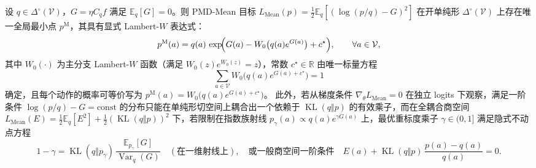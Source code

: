 \documentclass[lang=cn,scheme=chinese,openany]{../book/elegantbook}
\newcommand{\E}{\mathbb E}
\newcommand{\KL}{\operatorname{KL}}
\newcommand{\Var}{\operatorname{Var}}
\newcommand{\R}{\mathbb R}
\begin{document}
\begin{theorem}
\label{thm:ch2-mean-lambert}
设 $q\in\Delta^\circ(\mathcal V)$，$G=\eta C_q f$ 满足 $\E_q[G]=0$。则 PMD-Mean 目标 $L_{\mathrm{Mean}}(p)=\frac12\E_q[(\log(p/q)-G)^2]$ 在开单纯形 $\Delta^\circ(\mathcal V)$ 上存在唯一全局最小点 $p^{\mathrm M}$，其具有显式 Lambert-$W$ 表达式：
\begin{equation}
 p^{\mathrm M}(a)
 = q(a)\,\exp\!\Bigl(G(a)-W_0\bigl(q(a)e^{G(a)}\bigr)+c^\star\Bigr),
 \qquad \forall a\in\mathcal V,
 \label{eq:mean-lambert-solution}
\end{equation}
其中 $W_0(\cdot)$ 为主分支 Lambert-$W$ 函数（满足 $W_0(z)e^{W_0(z)}=z$），常数 $c^\star\in\R$ 由唯一标量方程
\begin{equation}
 \sum_{a\in\mathcal V} W_0\bigl(q(a)e^{G(a)+c^\star}\bigr)=1
 \label{eq:mean-lambert-cstar}
\end{equation}
确定，且每个动作的概率可等价写为 $p^{\mathrm M}(a)=W_0\bigl(q(a)e^{G(a)+c^\star}\bigr)$。
此外，若从梯度条件 $\nabla_\theta L_{\mathrm{Mean}}=0$ 在独立 logits 下观察，满足一阶条件 $\log(p/q)-G=\text{const}$ 的分布只能在单纯形切空间上耦合出一个依赖于 $\KL(q\Vert p)$ 的有效乘子，而在全耦合商空间 $L_{\mathrm{Mean}}(E)=\frac12\E_q[E^2]+\frac12(\KL(q\Vert p))^2$ 下，若限制在指数族射线 $p_\gamma(a)\propto q(a)e^{\gamma G(a)}$ 上，最优重标度乘子 $\gamma\in(0,1]$ 满足隐式不动点方程
\begin{equation}
 1-\gamma = \KL(q\Vert p_\gamma)\,\frac{\E_{p_\gamma}[G]}{\Var_q(G)}\quad(\text{在一维射线上}),
 \quad\text{或一般商空间一阶条件}\quad
 E(a)+\KL(q\Vert p)\,\frac{p(a)-q(a)}{q(a)}=0.
 \label{eq:mean-stationary-condition}
\end{equation}
\end{theorem}
\end{document}
